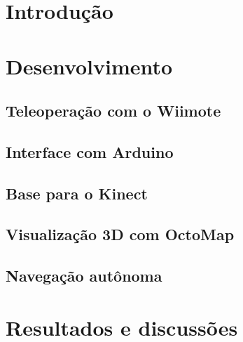 \documentclass[a4paper,11pt]{article}
\begin{document}

\section{Introdução}
\label{sec:intro}

	

\section{Desenvolvimento}
\label{sec:desenv}

	\subsection{Teleoperação com o Wiimote}
	\label{sec:desenv:wiiMote}
	
		
		
	\subsection{Interface com Arduino}
	\label{sec:desenv:arduino}
	
		
		
	\subsection{Base para o Kinect}
	\label{sec:desenv:baseKinect}
	
		
	
	\subsection{Visualização 3D com OctoMap}
	\label{sec:desenv:octomap}
		
		
	
	\subsection{Navegação autônoma}
	\label{sec:desenv:slam}
	
		

\section{Resultados e discussões}
\label{sec:result}
\end{document}
